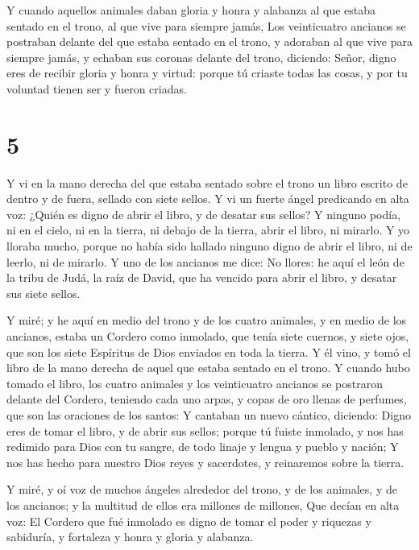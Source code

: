  Y cuando aquellos animales daban gloria y honra y alabanza
al que estaba sentado en el trono, al que vive para siempre jamás,
 Los veinticuatro ancianos se postraban delante del que
estaba sentado en el trono, y adoraban al que vive para siempre jamás, y
echaban sus coronas delante del trono, diciendo:  Señor,
digno eres de recibir gloria y honra y virtud: porque tú criaste todas
las cosas, y por tu voluntad tienen ser y fueron criadas.

\hypertarget{section-4}{%
\section{5}\label{section-4}}

 Y vi en la mano derecha del que estaba sentado sobre el
trono un libro escrito de dentro y de fuera, sellado con siete sellos.
 Y vi un fuerte ángel predicando en alta voz: ¿Quién es
digno de abrir el libro, y de desatar sus sellos?  Y ninguno
podía, ni en el cielo, ni en la tierra, ni debajo de la tierra, abrir el
libro, ni mirarlo.  Y yo lloraba mucho, porque no había sido
hallado ninguno digno de abrir el libro, ni de leerlo, ni de mirarlo.
 Y uno de los ancianos me dice: No llores: he aquí el león
de la tribu de Judá, la raíz de David, que ha vencido para abrir el
libro, y desatar sus siete sellos.

 Y miré; y he aquí en medio del trono y de los cuatro
animales, y en medio de los ancianos, estaba un Cordero como inmolado,
que tenía siete cuernos, y siete ojos, que son los siete Espíritus de
Dios enviados en toda la tierra.  Y él vino, y tomó el libro
de la mano derecha de aquel que estaba sentado en el trono. 
Y cuando hubo tomado el libro, los cuatro animales y los veinticuatro
ancianos se postraron delante del Cordero, teniendo cada uno arpas, y
copas de oro llenas de perfumes, que son las oraciones de los santos:
 Y cantaban un nuevo cántico, diciendo: Digno eres de tomar
el libro, y de abrir sus sellos; porque tú fuiste inmolado, y nos has
redimido para Dios con tu sangre, de todo linaje y lengua y pueblo y
nación;  Y nos has hecho para nuestro Dios reyes y
sacerdotes, y reinaremos sobre la tierra.

 Y miré, y oí voz de muchos ángeles alrededor del trono, y
de los animales, y de los ancianos; y la multitud de ellos era millones
de millones,  Que decían en alta voz: El Cordero que fué
inmolado es digno de tomar el poder y riquezas y sabiduría, y fortaleza
y honra y gloria y alabanza.

